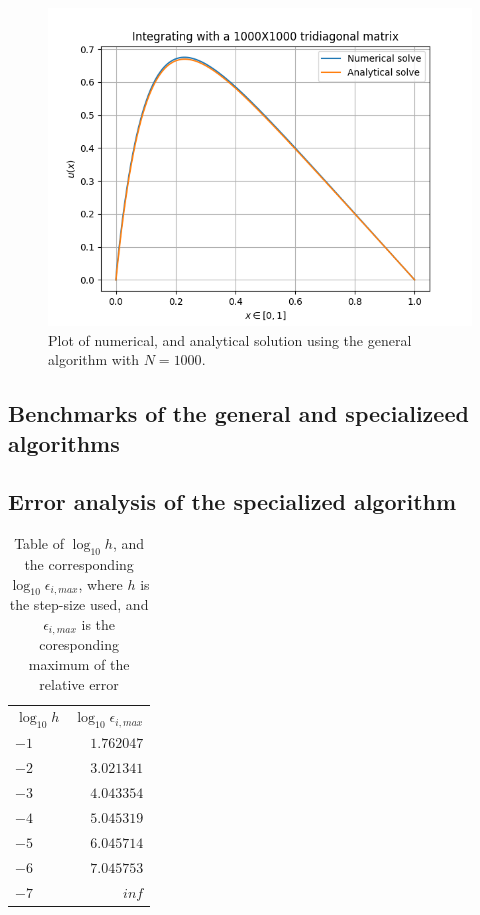 \documentclass[english,notitlepage]{revtex4-1}  %
\begin{document}
\begin{figure}[H]
	\centering
	\label{fig413}
	\includegraphics[width=\columnwidth]{../figures/NumVsAnal1000x1000.png}
	\caption{Plot of numerical, and analytical solution using the general algorithm with
	\(N=1000\).}
\end{figure}

\subsection{Benchmarks of the general and specializeed algorithms}\label{subsec:42}

\subsection{Error analysis of the specialized algorithm}\label{subsec:43}
\begin{table}[H]
	\centering
	\label{tab:431}
	\begin{tabular}{l|r}
	\(\log_{10}h\) & \(\log_{10}\epsilon_{i,max}\) \\
	\(-1\) & \(1.762047\) \\
	\(-2\) & \(3.021341\) \\
	\(-3\) & \(4.043354\) \\
	\(-4\) & \(5.045319\) \\
	\(-5\) & \(6.045714\) \\
	\(-6\) & \(7.045753\) \\
	\(-7\) & \(inf\) \\
	\end{tabular}
	\caption{Table of \(\log_{10}h\), and the corresponding \(\log_{10}\epsilon_{i,max}\),
	where \(h\) is the step-size used, and \(\epsilon_{i,max}\) is the coresponding
	maximum of the relative error}
\end{table}
\end{document}
